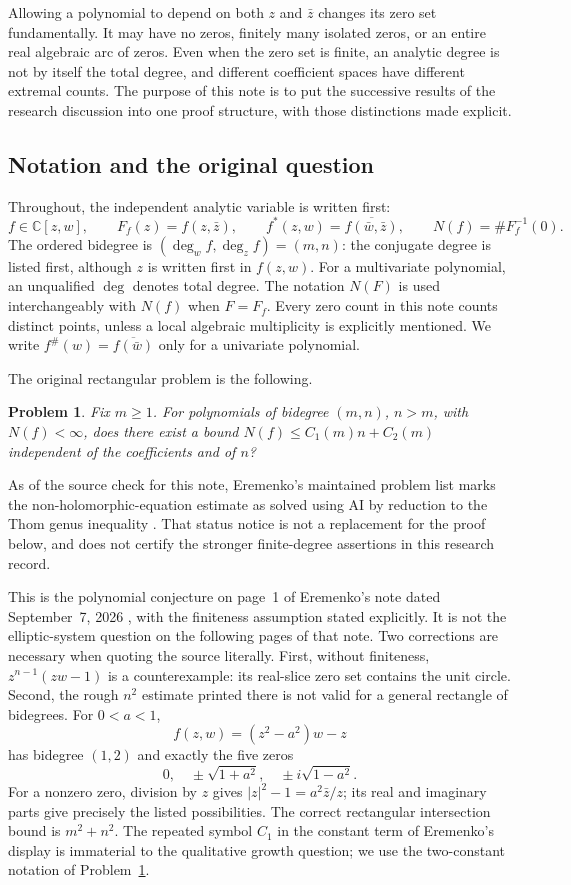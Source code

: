 \documentclass[UTF8,11pt]{ctexart}
\newtheorem{prob}[thm]{Problem}
\theoremstyle{definition}
\numberwithin{equation}{section}
\newcommand{\C}{\mathbb C}\newcommand{\R}{\mathbb R}
\begin{document}
Allowing a polynomial to depend on both $z$ and $\bar z$ changes its zero set fundamentally. It may have no zeros, finitely many isolated zeros, or an entire real algebraic arc of zeros. Even when the zero set is finite, an analytic degree is not by itself the total degree, and different coefficient spaces have different extremal counts. The purpose of this note is to put the successive results of the research discussion into one proof structure, with those distinctions made explicit.

\subsection{Notation and the original question}\label{sec:notation}
Throughout, the independent analytic variable is written first:
\[
 f\in\C[z,w],\qquad F_f(z)=f(z,\bar z),\qquad
 f^*(z,w)=\overline{f(\bar w,\bar z)},\qquad N(f)=\#F_f^{-1}(0).
\]
The ordered bidegree is $(\deg_w f,\deg_z f)=(m,n)$: the conjugate degree is listed first, although $z$ is written first in $f(z,w)$. For a multivariate polynomial, an unqualified $\deg$ denotes total degree. The notation $N(F)$ is used interchangeably with $N(f)$ when $F=F_f$. Every zero count in this note counts distinct points, unless a local algebraic multiplicity is explicitly mentioned. We write $f^\#(w)=\overline{f(\bar w)}$ only for a univariate polynomial.

The original rectangular problem is the following.
\begin{prob}\label{core:problem}
Fix $m\ge1$. For polynomials of bidegree $(m,n)$, $n>m$, with $N(f)<\infty$, does there exist a bound $N(f)\le C_1(m)n+C_2(m)$ independent of the coefficients and of $n$?
\end{prob}

As of the source check for this note, Eremenko's maintained problem list
marks the non-holomorphic-equation estimate as solved using AI by reduction
to the Thom genus inequality \cite{Ere26b}. That status notice is not a
replacement for the proof below, and does not certify the stronger
finite-degree assertions in this research record.

This is the polynomial conjecture on page~1 of Eremenko's note dated September~7, 2026 \cite[p.~1]{Ere26}, with the finiteness assumption stated explicitly. It is not the elliptic-system question on the following pages of that note. Two corrections are necessary when quoting the source literally. First, without finiteness, $z^{n-1}(zw-1)$ is a counterexample: its real-slice zero set contains the unit circle. Second, the rough $n^2$ estimate printed there is not valid for a general rectangle of bidegrees. For $0<a<1$,
\[
 f(z,w)=(z^2-a^2)w-z
\]
has bidegree $(1,2)$ and exactly the five zeros
\[
 0,\quad \pm\sqrt{1+a^2},\quad \pm i\sqrt{1-a^2}.
\]
For a nonzero zero, division by $z$ gives $|z|^2-1=a^2\bar z/z$; its real and imaginary parts give precisely the listed possibilities. The correct rectangular intersection bound is $m^2+n^2$. The repeated symbol $C_1$ in the constant term of Eremenko's display is immaterial to the qualitative growth question; we use the two-constant notation of Problem~\ref{core:problem}.
\end{document}

